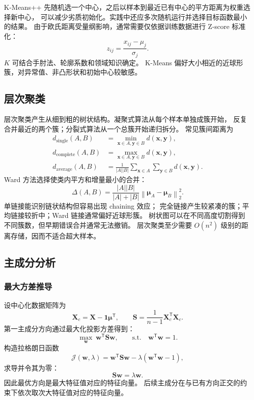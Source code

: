 \documentclass[UTF8,zihao=-4,a4paper,fontset=windows]{ctexart}
\newcommand{\norm}[1]{\left\lVert #1\right\rVert}
\newcommand{\abs}[1]{\left|#1\right|}
\begin{document}
K-Means++ 先随机选一个中心，之后以样本到最近已有中心的平方距离为权重选择新中心，
可以减少劣质初始化。实践中还应多次随机运行并选择目标函数最小的结果。
由于欧氏距离受量纲影响，通常需要仅依据训练数据进行 Z-score 标准化：
\begin{equation}
  z_{ij}=\frac{x_{ij}-\mu_j}{\sigma_j}.
\end{equation}
$K$ 可结合手肘法、轮廓系数和领域知识确定。
K-Means 偏好大小相近的近球形簇，对异常值、非凸形状和初始中心较敏感。

\subsection{层次聚类}

层次聚类产生从细到粗的树状结构。凝聚式算法从每个样本单独成簇开始，
反复合并最近的两个簇；分裂式算法从一个总簇开始递归拆分。
常见簇间距离为
\begin{align}
  d_{\mathrm{single}}(A,B)
  &=\min_{\bm{x}\in A,\bm{y}\in B}d(\bm{x},\bm{y}),\\
  d_{\mathrm{complete}}(A,B)
  &=\max_{\bm{x}\in A,\bm{y}\in B}d(\bm{x},\bm{y}),\\
  d_{\mathrm{average}}(A,B)
  &=\frac{1}{\abs A\abs B}
  \sum_{\bm{x}\in A}\sum_{\bm{y}\in B}
  d(\bm{x},\bm{y}).
\end{align}
Ward 方法选择使类内平方和增量最小的合并：
\begin{equation}
  \Delta(A,B)
  =\frac{\abs A\abs B}{\abs A+\abs B}
  \norm{\bm{\mu}_A-\bm{\mu}_B}_2^2.
\end{equation}
单链接能识别链状结构但容易出现 chaining 效应；
完全链接产生较紧凑的簇；平均链接较折中；Ward 链接通常偏好近球形簇。
树状图可以在不同高度切割得到不同簇数，但早期错误合并通常无法撤销。
层次聚类至少需要 $O(n^2)$ 级别的距离存储，因而不适合超大样本。

\subsection{主成分分析}

\subsubsection{最大方差推导}

设中心化数据矩阵为
\begin{equation}
  \bm{X}_c
  =\bm{X}-\bm{1}\bm{\mu}^{\mathsf T},
  \qquad
  \bm{S}=\frac{1}{n-1}\bm{X}_c^{\mathsf T}\bm{X}_c.
\end{equation}
第一主成分方向通过最大化投影方差得到\cite{jolliffe}：
\begin{equation}
  \max_{\bm{w}}\ \bm{w}^{\mathsf T}\bm{S}\bm{w},
  \qquad
  \text{s.t.}\quad\bm{w}^{\mathsf T}\bm{w}=1.
\end{equation}
构造拉格朗日函数
\begin{equation}
  \mathcal{J}(\bm{w},\lambda)
  =\bm{w}^{\mathsf T}\bm{S}\bm{w}
  -\lambda(\bm{w}^{\mathsf T}\bm{w}-1),
\end{equation}
求导并令其为零：
\begin{equation}
  \bm{S}\bm{w}=\lambda\bm{w}.
\end{equation}
因此最优方向是最大特征值对应的特征向量。
后续主成分在与已有方向正交的约束下依次取次大特征值对应的特征向量。
\end{document}
